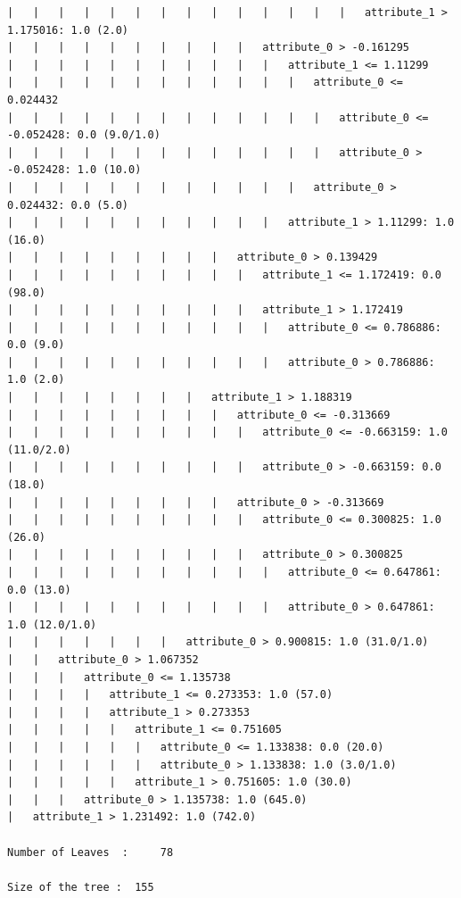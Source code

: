 \documentclass[a4paper]{article}
\theoremstyle{definition}
\newenvironment{soln}{
    \leavevmode\color{blue}\ignorespaces
}{}
\begin{document}
\begin{soln}
\begin{lstlisting}
|   |   |   |   |   |   |   |   |   |   |   |   |   |   attribute_1 > 1.175016: 1.0 (2.0)
|   |   |   |   |   |   |   |   |   |   attribute_0 > -0.161295
|   |   |   |   |   |   |   |   |   |   |   attribute_1 <= 1.11299
|   |   |   |   |   |   |   |   |   |   |   |   attribute_0 <= 0.024432
|   |   |   |   |   |   |   |   |   |   |   |   |   attribute_0 <= -0.052428: 0.0 (9.0/1.0)
|   |   |   |   |   |   |   |   |   |   |   |   |   attribute_0 > -0.052428: 1.0 (10.0)
|   |   |   |   |   |   |   |   |   |   |   |   attribute_0 > 0.024432: 0.0 (5.0)
|   |   |   |   |   |   |   |   |   |   |   attribute_1 > 1.11299: 1.0 (16.0)
|   |   |   |   |   |   |   |   |   attribute_0 > 0.139429
|   |   |   |   |   |   |   |   |   |   attribute_1 <= 1.172419: 0.0 (98.0)
|   |   |   |   |   |   |   |   |   |   attribute_1 > 1.172419
|   |   |   |   |   |   |   |   |   |   |   attribute_0 <= 0.786886: 0.0 (9.0)
|   |   |   |   |   |   |   |   |   |   |   attribute_0 > 0.786886: 1.0 (2.0)
|   |   |   |   |   |   |   |   attribute_1 > 1.188319
|   |   |   |   |   |   |   |   |   attribute_0 <= -0.313669
|   |   |   |   |   |   |   |   |   |   attribute_0 <= -0.663159: 1.0 (11.0/2.0)
|   |   |   |   |   |   |   |   |   |   attribute_0 > -0.663159: 0.0 (18.0)
|   |   |   |   |   |   |   |   |   attribute_0 > -0.313669
|   |   |   |   |   |   |   |   |   |   attribute_0 <= 0.300825: 1.0 (26.0)
|   |   |   |   |   |   |   |   |   |   attribute_0 > 0.300825
|   |   |   |   |   |   |   |   |   |   |   attribute_0 <= 0.647861: 0.0 (13.0)
|   |   |   |   |   |   |   |   |   |   |   attribute_0 > 0.647861: 1.0 (12.0/1.0)
|   |   |   |   |   |   |   attribute_0 > 0.900815: 1.0 (31.0/1.0)
|   |   attribute_0 > 1.067352
|   |   |   attribute_0 <= 1.135738
|   |   |   |   attribute_1 <= 0.273353: 1.0 (57.0)
|   |   |   |   attribute_1 > 0.273353
|   |   |   |   |   attribute_1 <= 0.751605
|   |   |   |   |   |   attribute_0 <= 1.133838: 0.0 (20.0)
|   |   |   |   |   |   attribute_0 > 1.133838: 1.0 (3.0/1.0)
|   |   |   |   |   attribute_1 > 0.751605: 1.0 (30.0)
|   |   |   attribute_0 > 1.135738: 1.0 (645.0)
|   attribute_1 > 1.231492: 1.0 (742.0)

Number of Leaves  : 	78

Size of the tree : 	155

\end{lstlisting}

\vspace{7cm}



\end{soln}


\end{document}
